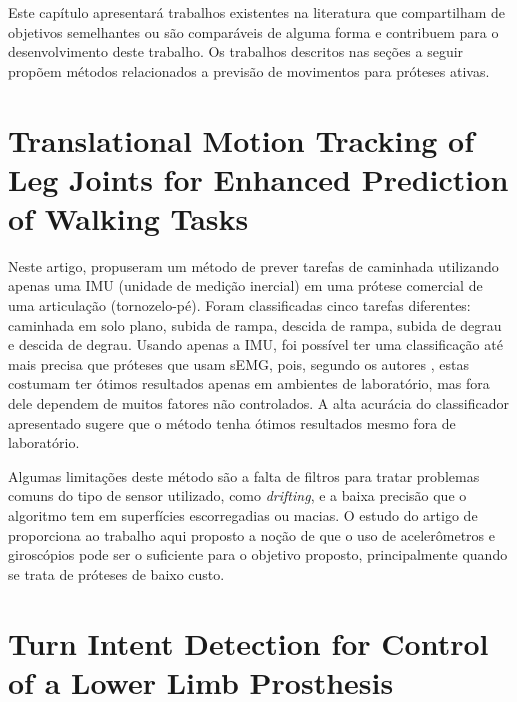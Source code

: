 Este capítulo apresentará trabalhos existentes na literatura que compartilham de objetivos semelhantes ou são comparáveis de alguma forma e contribuem para o desenvolvimento deste trabalho. Os trabalhos descritos nas seções a seguir propõem métodos relacionados a previsão de movimentos para próteses ativas.

\section{Translational Motion Tracking of Leg Joints for Enhanced Prediction of Walking Tasks}
\label{sec:rel_stolyarov}

Neste artigo,  propuseram um método de prever tarefas de caminhada utilizando apenas uma IMU (unidade de medição inercial) em uma prótese comercial de uma articulação (tornozelo-pé). Foram classificadas cinco tarefas diferentes: caminhada em solo plano, subida de rampa, descida de rampa, subida de degrau e descida de degrau. Usando apenas a IMU, foi possível ter uma classificação até mais precisa que próteses que usam sEMG, pois, segundo os autores , estas costumam ter ótimos resultados apenas em ambientes de laboratório, mas fora dele dependem de muitos fatores não controlados. A alta acurácia do classificador apresentado sugere que o método tenha ótimos resultados mesmo fora de laboratório.

Algumas limitações deste método são a falta de filtros para tratar problemas comuns do tipo de sensor utilizado, como \textit{drifting}, e a baixa precisão que o algoritmo tem em superfícies escorregadias ou macias.
% 
O estudo do artigo de  proporciona ao trabalho aqui proposto a noção de que o uso de acelerômetros e giroscópios pode ser o suficiente para o objetivo proposto, principalmente quando se trata de próteses de baixo custo.

\section{Turn Intent Detection for Control of a Lower Limb Prosthesis}
\label{sec:rel_pew}

